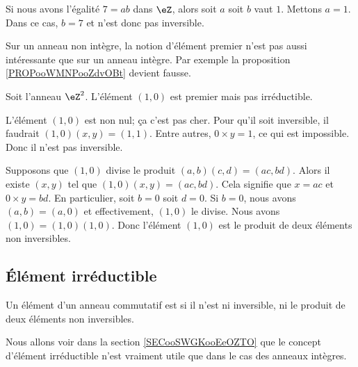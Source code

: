\begin{example}
	Si nous avons l'égalité \( 7=ab\) dans \( \eZ\), alors soit \( a\) soit \( b\) vaut \( 1\). Mettons \( a=1\). Dans ce cas, \( b=7\) et n'est donc pas inversible.
\end{example}

Sur un anneau non intègre, la notion d'élément premier n'est pas aussi intéressante que sur un anneau intègre. Par exemple la proposition \ref{PROPooWMNPooZdvOBt} devient fausse.

\begin{example}     \label{EXooEIUEooCZCPMC}
	Soit l'anneau \( \eZ^2\). L'élément \( (1,0)\) est premier mais pas irréductible.
	\begin{subproof}
		L'élément \( (1,0)\) est non nul; ça c'est pas cher. Pour qu'il soit inversible, il faudrait \( (1,0)(x,y)=(1,1)\). Entre autres, \( 0\times y=1\), ce qui est impossible. Donc il n'est pas inversible.

		Supposons que \( (1,0)\) divise le produit \( (a,b)(c,d)=(ac,bd)\). Alors il existe \( (x,y)\) tel que \( (1,0)(x,y)=(ac,bd)\). Cela signifie que \( x=ac\) et \( 0\times y=bd\). En particulier, soit \( b=0\) soit \( d=0\). Si \( b=0\), nous avons \( (a,b)=(a,0)\) et effectivement, \( (1,0)\) le divise.
		Nous avons \( (1,0)=(1,0)(1,0)\). Donc l'élément \( (1,0)\) est le produit de deux éléments non inversibles.
	\end{subproof}
\end{example}



\subsection{Élément irréductible}

\begin{definition}  \label{DeirredBDhQfA}
    Un élément d'un anneau commutatif est  si il n'est ni inversible, ni le produit de deux éléments non inversibles. 
\end{definition}

\begin{normaltext}
	Nous allons voir dans la section \ref{SECooSWGKooEeOZTO} que le concept d'élément irréductible n'est vraiment utile que dans le cas des anneaux intègres.
\end{normaltext}

